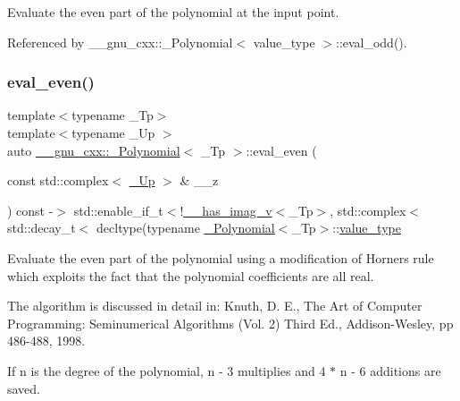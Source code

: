 Evaluate the even part of the polynomial at the input point. 

Referenced by \+\_\+\+\_\+gnu\+\_\+cxx\+::\+\_\+\+Polynomial$<$ value\+\_\+type $>$\+::eval\+\_\+odd().

\mbox{\label{class____gnu__cxx_1_1__Polynomial_a7314653c50b311781a26ac74789d84a1}} 
\subsubsection{\texorpdfstring{eval\+\_\+even()}{eval\_even()}\hspace{0.1cm}{\footnotesize\ttfamily [3/3]}}
{\footnotesize\ttfamily template$<$typename \+\_\+\+Tp$>$ \\
template$<$typename \+\_\+\+Up $>$ \\
auto \hyperlink{class____gnu__cxx_1_1__Polynomial}{\+\_\+\+\_\+gnu\+\_\+cxx\+::\+\_\+\+Polynomial}$<$ \+\_\+\+Tp $>$\+::eval\+\_\+even (\begin{DoxyParamCaption}\item[{const std\+::complex$<$ \hyperlink{class____gnu__cxx_1_1__Polynomial_a242114d4b86648a5dff67a8221f80d40}{\+\_\+\+Up} $>$ \&}]{\+\_\+\+\_\+z }\end{DoxyParamCaption}) const -\/$>$ std\+::enable\+\_\+if\+\_\+t$<$!\hyperlink{namespace____gnu__cxx_afa2404a914b06f950f3a46e75aca51a9}{\+\_\+\+\_\+has\+\_\+imag\+\_\+v}$<$\+\_\+\+Tp$>$,
			    std\+::complex$<$std\+::decay\+\_\+t$<$
		decltype(typename \hyperlink{class____gnu__cxx_1_1__Polynomial}{\+\_\+\+Polynomial}$<$\+\_\+\+Tp$>$\+::\hyperlink{class____gnu__cxx_1_1__Polynomial_a725563351f50e76084a7a016c06f8a53}{value\+\_\+type}\hspace{0.3cm}{\ttfamily [inline]}}

Evaluate the even part of the polynomial using a modification of Horner\textquotesingle{}s rule which exploits the fact that the polynomial coefficients are all real.

The algorithm is discussed in detail in\+: Knuth, D. E., The Art of Computer Programming\+: Seminumerical Algorithms (Vol. 2) Third Ed., Addison-\/\+Wesley, pp 486-\/488, 1998.

If n is the degree of the polynomial, n -\/ 3 multiplies and 4 $\ast$ n -\/ 6 additions are saved. 

